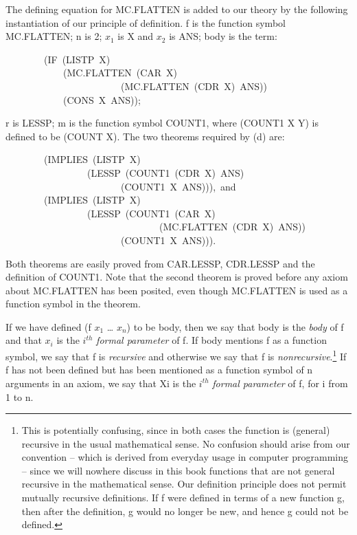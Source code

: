 \documentclass[11pt]{book}
\newenvironment{pubasis}{\begin{flushleft}\ttfamily\small}{\normalsize\rmfamily\end{flushleft}}
\newcommand{\pubinlineunderline}[1]{\emph{#1}}
\begin{document}
The defining equation for MC.FLAT\-TEN is added to our theory
by the following instantiation of our principle of definition.
f is the function symbol MC.FLAT\-TEN; n is 2; $x_{1}$ is X and
$x_{2}$ is ANS; body is the term:
\begin{pubasis}
~~~~~~~~(IF~(LISTP~X)\\
~~~~~~~~~~~~(MC.FLAT\-TEN~(CAR~X)\\
~~~~~~~~~~~~~~~~~~~~~~~~(MC.FLAT\-TEN~(CDR~X)~ANS))\\
~~~~~~~~~~~~(CONS~X~ANS));\\
\end{pubasis}
r is LESSP; m is the function symbol COUNT1, where (COUNT1 X Y)
is defined to be (COUNT X).  The two theorems required by (d) are:
\begin{pubasis}
~~~~~~~~(IMPLIES~(LISTP~X)\\
~~~~~~~~~~~~~~~~~(LESSP~(COUNT1~(CDR~X)~ANS)\\
~~~~~~~~~~~~~~~~~~~~~~~~(COUNT1~X~ANS))),~and\\

~~~~~~~~(IMPLIES~(LISTP~X)\\
~~~~~~~~~~~~~~~~~(LESSP~(COUNT1~(CAR~X)\\
~~~~~~~~~~~~~~~~~~~~~~~~~~~~~~~~(MC.FLAT\-TEN~(CDR~X)~ANS))\\
~~~~~~~~~~~~~~~~~~~~~~~~(COUNT1~X~ANS))).\\
\end{pubasis}
Both theorems are easily proved from CAR.LESSP, CDR.LESSP and the
definition of COUNT1.  Note that the second theorem is
proved before any axiom about MC.FLAT\-TEN has been posited,
even though MC.FLAT\-TEN is used as a function symbol in the theorem.

If we have defined (f $x_{1}$ \ldots{} $x_{n}$) to be body, then
we say that body is the \pubinlineunderline{body} of f and that $x_{i}$ is
the $i^{th}$ \pubinlineunderline{formal parameter} of f.  If body mentions
f as a function symbol, we say that f is \pubinlineunderline{recursive}
and otherwise we say that f is \pubinlineunderline{nonrecursive}.\footnote{This is potentially confusing, since in both cases the function is (general) recursive in the usual mathematical sense.  No confusion should arise from our convention -- which is derived from everyday usage in computer programming -- since we will nowhere discuss in this book functions that are not general recursive in the mathematical sense.  Our definition principle does not permit mutually recursive definitions.  If f were defined in terms of a new function g, then after the definition, g would no longer be new, and hence g could not be defined.}
If f has not been defined but has been mentioned as a function
symbol of n arguments in an axiom, we say that Xi is the
$i^{th}$ \pubinlineunderline{formal parameter} of f, for i from 1 to n.
\end{document}
